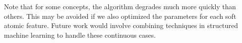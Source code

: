 \documentclass{acmsiggraph}
\begin{document}


Note that for some concepts,
the algorithm degrades much more quickly
than others.
This may be avoided
if we also optimized the parameters
for each soft atomic feature.
Future work would involve 
combining techniques in structured machine learning
to handle these continuous cases.

% 
% 
% 
% 
% 
% 
% 
% 
% 
\end{document}
